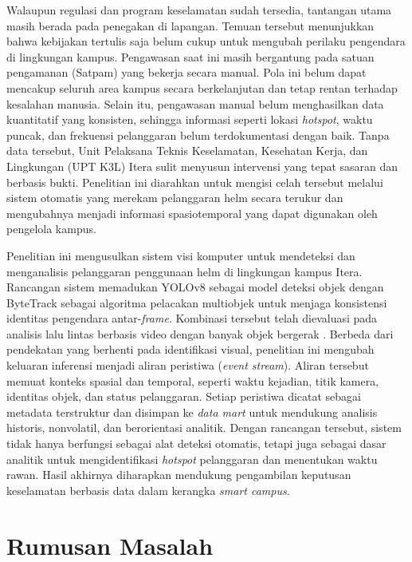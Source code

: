 Walaupun regulasi dan program keselamatan sudah tersedia, tantangan utama
masih berada pada penegakan di lapangan. Temuan tersebut menunjukkan bahwa
kebijakan tertulis saja belum cukup untuk mengubah perilaku pengendara di
lingkungan kampus. Pengawasan saat ini masih bergantung pada satuan pengamanan
(Satpam) yang bekerja secara manual. Pola ini belum dapat mencakup seluruh
area kampus secara berkelanjutan dan tetap rentan terhadap kesalahan manusia.
Selain itu, pengawasan manual belum menghasilkan data kuantitatif yang
konsisten, sehingga informasi seperti lokasi \textit{hotspot}, waktu puncak,
dan frekuensi pelanggaran belum terdokumentasi dengan baik. Tanpa data
tersebut, Unit Pelaksana Teknis Keselamatan, Kesehatan Kerja, dan Lingkungan
(UPT K3L) Itera sulit menyusun intervensi yang tepat sasaran dan berbasis
bukti. Penelitian ini diarahkan untuk mengisi celah tersebut melalui sistem
otomatis yang merekam pelanggaran helm secara terukur dan mengubahnya menjadi
informasi spasiotemporal yang dapat digunakan oleh pengelola kampus.

Penelitian ini mengusulkan sistem visi komputer untuk mendeteksi dan
menganalisis pelanggaran penggunaan helm di lingkungan kampus Itera. Rancangan
sistem memadukan YOLOv8 sebagai model deteksi objek dengan ByteTrack sebagai
algoritma pelacakan multiobjek untuk menjaga konsistensi identitas pengendara
antar-\textit{frame}. Kombinasi tersebut telah dievaluasi pada analisis lalu
lintas berbasis video dengan banyak objek bergerak \cite{liu2025vehicle}.
Berbeda dari pendekatan yang berhenti pada identifikasi visual, penelitian ini
mengubah keluaran inferensi menjadi aliran peristiwa (\textit{event stream}).
Aliran tersebut memuat konteks spasial dan temporal, seperti waktu kejadian,
titik kamera, identitas objek, dan status pelanggaran. Setiap peristiwa
dicatat sebagai metadata terstruktur dan disimpan ke \textit{data mart} untuk
mendukung analisis historis, nonvolatil, dan berorientasi analitik. Dengan
rancangan tersebut, sistem tidak hanya berfungsi sebagai alat deteksi otomatis,
tetapi juga sebagai dasar analitik untuk mengidentifikasi \textit{hotspot}
pelanggaran dan menentukan waktu rawan. Hasil akhirnya diharapkan mendukung
pengambilan keputusan keselamatan berbasis data dalam kerangka \textit{smart
campus}.

\section{Rumusan Masalah}
\label{section:rumusanmasalah}

